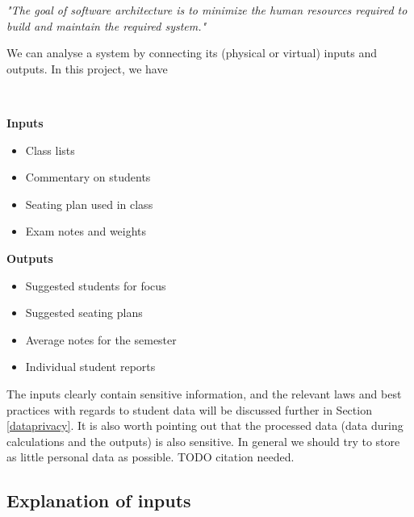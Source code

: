 \documentclass[10pt]{article}
\begin{document}
\begin{center}
\emph{"The goal of software architecture is to minimize the human resources required to build and maintain the required system."} \cite[p. 5]{Mart17}
\end{center}


We can analyse a system by connecting its (physical or virtual) inputs and outputs. In this project, we have

\

\begin{minipage}[t]{0.38\textwidth}

\textbf{Inputs}

\begin{itemize}
\item Class lists
\item Commentary on students
\item Seating plan used in class
\item Exam notes and weights
\end{itemize}


\end{minipage}
\hfill
\vline
\hfill
\begin{minipage}[t]{0.48\textwidth}

\textbf{Outputs}

\begin{itemize}
\item Suggested students for focus
\item Suggested seating plans
\item Average notes for the semester
\item Individual student reports
\end{itemize}

\end{minipage}

\vspace{5mm}

The inputs clearly contain sensitive information, and the relevant laws and best practices with regards to student data will be discussed further in Section \ref{dataprivacy}. It is also worth pointing out that the processed data (data during calculations and the outputs) is also sensitive. In general we should try to store as little personal data as possible. TODO citation needed.

\subsection{Explanation of inputs}
\end{document}
